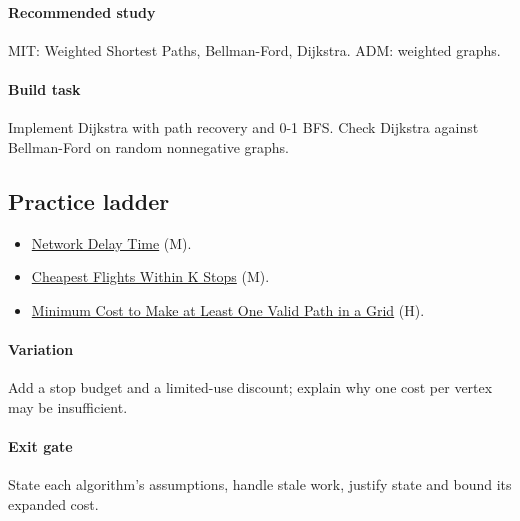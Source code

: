 \documentclass[11pt,letterpaper]{article}
\begin{document}
\paragraph*{Recommended study}

MIT: Weighted Shortest Paths, Bellman-Ford, Dijkstra. ADM: weighted graphs.

\paragraph*{Build task}

Implement Dijkstra with path recovery and 0-1 BFS. Check Dijkstra against Bellman-Ford on random nonnegative graphs.

\subsection*{Practice ladder}

\begin{itemize}

\item \href{https://leetcode.com/problems/network-delay-time/}{Network Delay Time} (M).

\item \href{https://leetcode.com/problems/cheapest-flights-within-k-stops/}{Cheapest Flights Within K Stops} (M).

\item \href{https://leetcode.com/problems/minimum-cost-to-make-at-least-one-valid-path-in-a-grid/}{Minimum Cost to Make at Least One Valid Path in a Grid} (H).

\end{itemize}

\paragraph*{Variation}

Add a stop budget and a limited-use discount; explain why one cost per vertex may be insufficient.

\paragraph*{Exit gate}

State each algorithm's assumptions, handle stale work, justify state and bound its expanded cost.
\end{document}

